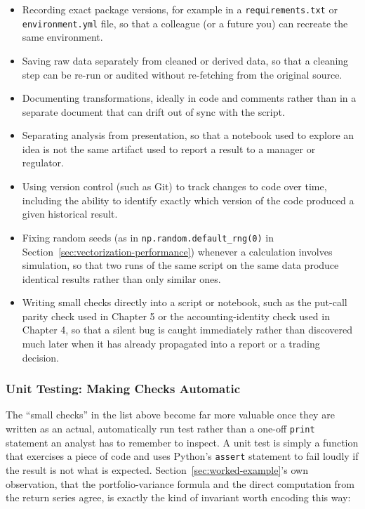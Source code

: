 \documentclass[../ai_in_finance]{subfiles}
\begin{document}
\begin{itemize}
    \item Recording exact package versions, for example in a \texttt{requirements.txt} or \texttt{environment.yml} file, so that a colleague (or a future you) can recreate the same environment.
    \item Saving raw data separately from cleaned or derived data, so that a cleaning step can be re-run or audited without re-fetching from the original source.
    \item Documenting transformations, ideally in code and comments rather than in a separate document that can drift out of sync with the script.
    \item Separating analysis from presentation, so that a notebook used to explore an idea is not the same artifact used to report a result to a manager or regulator.
    \item Using version control (such as Git) to track changes to code over time, including the ability to identify exactly which version of the code produced a given historical result.
    \item Fixing random seeds (as in \texttt{np.random.default\_rng(0)} in Section~\ref{sec:vectorization-performance}) whenever a calculation involves simulation, so that two runs of the same script on the same data produce identical results rather than only similar ones.
    \item Writing small checks directly into a script or notebook, such as the put-call parity check used in Chapter 5 or the accounting-identity check used in Chapter 4, so that a silent bug is caught immediately rather than discovered much later when it has already propagated into a report or a trading decision.
\end{itemize}

\subsubsection*{Unit Testing: Making Checks Automatic}

The ``small checks'' in the list above become far more valuable once they are written as an actual, automatically run test rather than a one-off \texttt{print} statement an analyst has to remember to inspect. A unit test is simply a function that exercises a piece of code and uses Python's \texttt{assert} statement to fail loudly if the result is not what is expected. Section~\ref{sec:worked-example}'s own observation, that the portfolio-variance formula and the direct computation from the return series agree, is exactly the kind of invariant worth encoding this way:
\end{document}
